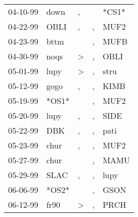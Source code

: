 \begin{supertabular}{p{0.07\textwidth}p{0.06\textwidth}p{0.02\textwidth}p{0.02\textwidth}p{0.06\textwidth}}
          04-10-99\textsuperscript{} &           down\textsuperscript{} &                , &                  &                            *CS1* \\
          04-22-99\textsuperscript{} &           OBLI\textsuperscript{} &                , &                , &           MUF2\textsuperscript{} \\
          04-23-99\textsuperscript{} &           bttm\textsuperscript{} &                  &                , &           MUFB\textsuperscript{} \\
          04-30-99\textsuperscript{} &           noqs\textsuperscript{} &     \textgreater &                , &           OBLI\textsuperscript{} \\
          05-01-99\textsuperscript{} &           lupy\textsuperscript{} &     \textgreater &                , &           stru\textsuperscript{} \\
          05-12-99\textsuperscript{} &           gogo\textsuperscript{} &                , &                , &           KIMB\textsuperscript{} \\
          05-19-99\textsuperscript{} &                            *OS1* &                  &                , &           MUF2\textsuperscript{} \\
          05-20-99\textsuperscript{} &           lupy\textsuperscript{} &                , &                , &           SIDE\textsuperscript{} \\
          05-22-99\textsuperscript{} &            DBK\textsuperscript{} &                , &                , &           pati\textsuperscript{} \\
          05-23-99\textsuperscript{} &           chur\textsuperscript{} &                , &                , &           MUF2\textsuperscript{} \\
          05-27-99\textsuperscript{} &           chur\textsuperscript{} &                  &                , &           MAMU\textsuperscript{} \\
          05-29-99\textsuperscript{} &           SLAC\textsuperscript{} &                , &                , &           lupy\textsuperscript{} \\
          06-06-99\textsuperscript{} &                            *OS2* &                  &                , &           GSON\textsuperscript{} \\
          06-12-99\textsuperscript{} &           fr90\textsuperscript{} &     \textgreater &                , &           PRCH\textsuperscript{} \\

\end{supertabular}
